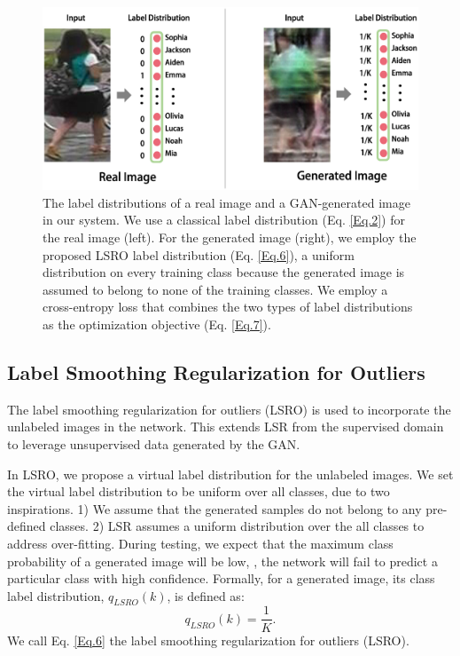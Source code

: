 \documentclass[10pt,twocolumn,letterpaper]{article}
\begin{document}
\begin{figure}[t]
\begin{center}
   \includegraphics[width=1\linewidth]{fig2.eps}
\end{center}
   \caption{The label distributions of a real image and a GAN-generated image in our system. We use a classical label distribution (Eq. \ref{Eq.2}) for the real image (left). For the generated image (right), we employ the proposed LSRO label distribution (Eq. \ref{Eq.6}), \eg a uniform distribution on every training class because the generated image is assumed to belong to none of the training classes. We employ a cross-entropy loss that combines the two types of label distributions as the optimization objective (Eq. \ref{Eq.7}). }
\label{fig:method}
\end{figure} 

\subsection{Label Smoothing Regularization for Outliers}
The label smoothing regularization for outliers (LSRO) is used to incorporate the unlabeled images in the network. This extends LSR from the supervised domain to leverage unsupervised data generated by the GAN. 

In LSRO, we propose a virtual label distribution for the unlabeled images. We set the virtual label distribution to be uniform over all classes, due to two inspirations. 1) We assume that the generated samples do not belong to any pre-defined classes. 2) LSR assumes a uniform distribution over the all classes to address over-fitting. During testing, we expect that the maximum class probability of a generated image will be low, \ie, the network will fail to predict a particular class with high confidence. Formally, for a generated image, its class label distribution, $q_{LSRO}(k)$, is defined as:
\begin{equation}
    q_{LSRO}(k)= \frac{1}{K}.
\label{Eq.6}
\end{equation}
We call Eq. \ref{Eq.6} the label smoothing regularization for outliers (LSRO). 
\end{document}
